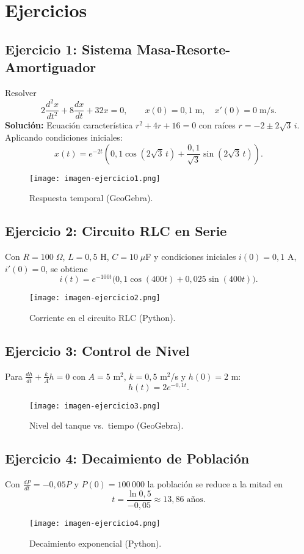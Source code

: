 \section{Ejercicios}

\subsection{Ejercicio 1: Sistema Masa-Resorte-Amortiguador}

Resolver
\[
2\frac{d^2x}{dt^2}+8\frac{dx}{dt}+32x=0,\qquad x(0)=0{,}1\;\text{m},\quad x'(0)=0\;\text{m/s}.
\]
\textbf{Solución:} Ecuación característica $r^2+4r+16=0$ con raíces $r=-2\pm2\sqrt{3}\,i$.  
Aplicando condiciones iniciales:
\[
x(t)=e^{-2t}\left(0{,}1\cos(2\sqrt{3}\,t)+\frac{0{,}1}{\sqrt{3}}\sin(2\sqrt{3}\,t)\right).
\]
\begin{figure}[H]
\centering
\texttt{[image: imagen-ejercicio1.png]}
\caption{Respuesta temporal (GeoGebra).}
\end{figure}

\subsection{Ejercicio 2: Circuito RLC en Serie}
Con $R=100\;\Omega$, $L=0{,}5$ H, $C=10\;\mu$F y condiciones iniciales $i(0)=0{,}1$ A, $i'(0)=0$, se obtiene
\[
i(t)=e^{-100t}\bigl(0{,}1\cos(400t)+0{,}025\sin(400t)\bigr).
\]
\begin{figure}[H]
\centering
\texttt{[image: imagen-ejercicio2.png]}
\caption{Corriente en el circuito RLC (Python).}
\end{figure}

\subsection{Ejercicio 3: Control de Nivel}
Para $\frac{dh}{dt}+\frac{k}{A}h=0$ con $A=5$ m$^2$, $k=0{,}5$ m$^2$/s y $h(0)=2$ m:
\[
h(t)=2e^{-0{,}1t}.
\]
\begin{figure}[H]
\centering
\texttt{[image: imagen-ejercicio3.png]}
\caption{Nivel del tanque vs.\ tiempo (GeoGebra).}
\end{figure}

\subsection{Ejercicio 4: Decaimiento de Población}
Con $\frac{dP}{dt}=-0{,}05P$ y $P(0)=100\,000$ la población se reduce a la mitad en
\[
t=\frac{\ln 0{,}5}{-0{,}05}\approx13{,}86\;\text{años}.
\]
\begin{figure}[H]
\centering
\texttt{[image: imagen-ejercicio4.png]}
\caption{Decaimiento exponencial (Python).}
\end{figure}

